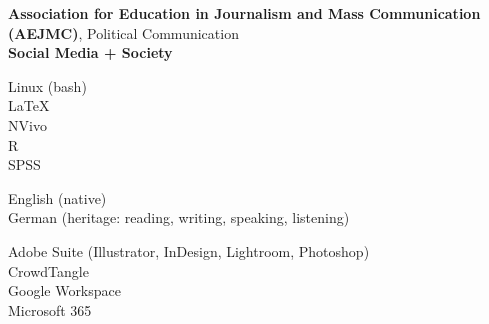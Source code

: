 \begin{small} \color{black}

\textbf{Association for Education in Journalism and Mass Communication (AEJMC)}, Political Communication \\
\textbf{Social Media + Society}\\

\end{small}
\begin{small} \color{black}


Linux (bash) \\
\textrm{\LaTeX} \\
NVivo \\
R \\
SPSS \\


English (native) \\
German (heritage: reading, writing, speaking, listening) \\



Adobe Suite (Illustrator, InDesign, Lightroom, Photoshop) \\
CrowdTangle \\
Google Workspace \\
Microsoft 365 \\


\end{small}




